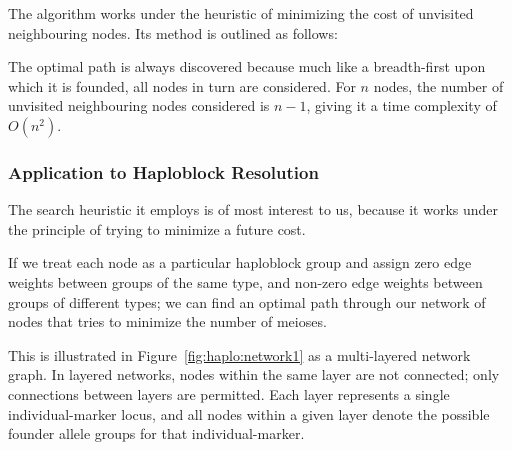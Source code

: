 The algorithm works under the heuristic of minimizing the cost of unvisited neighbouring nodes. Its method is outlined as follows:
\begingroup
\begin{spacing}{1}
\begin{enumerate}

\end{enumerate}
\end{spacing}
\endgroup

The optimal path is always discovered because much like a breadth-first upon which it is founded, all nodes in turn are considered. For $n$ nodes, the number of unvisited neighbouring nodes considered is $n-1$, giving it a time complexity of $O(n^2)$.


\subsubsection{Application to Haploblock Resolution}

The search heuristic it employs is of most interest to us, because it works under the principle of trying to minimize a future cost. 

If we treat each node as a particular haploblock group and assign zero edge weights between groups of the same type, and non-zero edge weights between groups of different types; we can find an optimal path through our network of nodes that tries to minimize the number of meioses.

This is illustrated in Figure~\ref{fig:haplo:network1} as a multi-layered network graph. In layered networks, nodes within the same layer are not connected; only connections between layers are permitted. Each layer represents a single individual-marker locus, and all nodes within a given layer denote the possible founder allele groups for that individual-marker.

